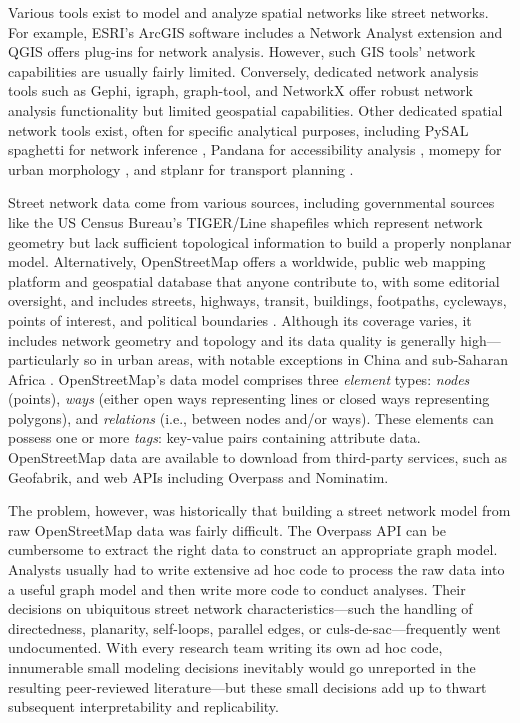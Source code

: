 \documentclass[12pt,letterpaper]{article} %
\begin{document}
Various tools exist to model and analyze spatial networks like street networks. For example, ESRI's ArcGIS software includes a Network Analyst extension and QGIS offers plug-ins for network analysis. However, such GIS tools' network capabilities are usually fairly limited. Conversely, dedicated network analysis tools such as Gephi, igraph, graph-tool, and NetworkX offer robust network analysis functionality but limited geospatial capabilities. Other dedicated spatial network tools exist, often for specific analytical purposes, including PySAL spaghetti for network inference \citep{gaboardi_spaghetti_2021,rey_pysal_2022}, Pandana for accessibility analysis \citep{foti_behavioral_2014}, momepy for urban morphology \citep{fleischmann_momepy_2019}, and stplanr for transport planning \citep{lovelace_stplanr_2019}.

Street network data come from various sources, including governmental sources like the US Census Bureau's TIGER/Line shapefiles which represent network geometry but lack sufficient topological information to build a properly nonplanar model. Alternatively, OpenStreetMap offers a worldwide, public web mapping platform and geospatial database that anyone contribute to, with some editorial oversight, and includes streets, highways, transit, buildings, footpaths, cycleways, points of interest, and political boundaries \citep{jokar_arsanjani_openstreetmap_2015}. Although its coverage varies, it includes network geometry and topology and its data quality is generally high---particularly so in urban areas, with notable exceptions in China and sub-Saharan Africa \citep{barron_comprehensive_2014,barrington-leigh_worlds_2017}. OpenStreetMap's data model comprises three \textit{element} types: \textit{nodes} (points), \textit{ways} (either open ways representing lines or closed ways representing polygons), and \textit{relations} (i.e., between nodes and/or ways). These elements can possess one or more \textit{tags}: key-value pairs containing attribute data. OpenStreetMap data are available to download from third-party services, such as Geofabrik, and web APIs including Overpass and Nominatim.

The problem, however, was historically that building a street network model from raw OpenStreetMap data was fairly difficult. The Overpass API can be cumbersome to extract the right data to construct an appropriate graph model. Analysts usually had to write extensive ad hoc code to process the raw data into a useful graph model and then write more code to conduct analyses. Their decisions on ubiquitous street network characteristics---such the handling of directedness, planarity, self-loops, parallel edges, or culs-de-sac---frequently went undocumented. With every research team writing its own ad hoc code, innumerable small modeling decisions inevitably would go unreported in the resulting peer-reviewed literature---but these small decisions add up to thwart subsequent interpretability and replicability.
\end{document}

